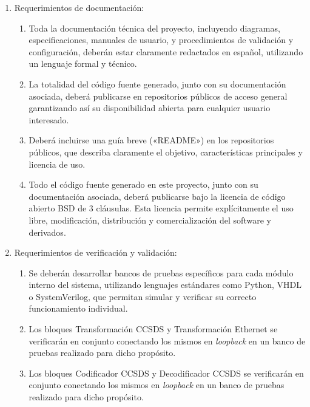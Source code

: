 \documentclass[
11pt, %
]{charter}
\begin{document}
\begin {enumerate}
\begin{enumerate}
			\item El sistema debe ser capaz de codificar y decodificar tramas CCSDS completas agregando códigos Reed-Solomon para detección y corrección de errores, según la configuración estándar (255,239).
			\item El bloque modulador debe implementar un esquema de modulación digital compatible con los estándares utilizados en sistemas espaciales CCSDS: \textit{Binary Phase Shift Keying} (BPSK) y \textit{Quadrature Phase Shift Keying} (QPSK) según lo especificado en el estándar CCSDS 401.0-B.			
		\end{enumerate}	
	\item Requerimientos de documentación:
		\begin{enumerate}
			\item Toda la documentación técnica del proyecto, incluyendo diagramas, especificaciones, manuales de usuario, y procedimientos de validación y configuración, deberán estar claramente redactados en español, utilizando un lenguaje formal y técnico.
			\item La totalidad del código fuente generado, junto con su documentación asociada, deberá publicarse en repositorios públicos de acceso general garantizando así su disponibilidad abierta para cualquier usuario interesado.		
			\item Deberá incluirse una guía breve («README») en los repositorios públicos, que describa claramente el objetivo, características principales y licencia de uso.
			\item Todo el código fuente generado en este proyecto, junto con su documentación asociada, deberá publicarse bajo la licencia de código abierto BSD de 3 cláusulas. Esta licencia permite explícitamente el uso libre, modificación, distribución y comercialización del software y derivados.
		\end{enumerate}				
	\item Requerimientos de verificación y validación:
		\begin{enumerate}
			\item Se deberán desarrollar bancos de pruebas específicos para cada módulo interno del sistema, utilizando lenguajes estándares como Python, VHDL o SystemVerilog, que permitan simular y verificar su correcto funcionamiento individual.
			\item Los bloques Transformación CCSDS y Transformación Ethernet se verificarán en conjunto conectando los mismos en \textit{loopback} en un banco de pruebas realizado para dicho propósito.
			\item Los bloques Codificador CCSDS y Decodificador CCSDS se verificarán en conjunto conectando los mismos en \textit{loopback} en un banco de pruebas realizado para dicho propósito.			

\end{enumerate}
\end{enumerate}
\end{document}
